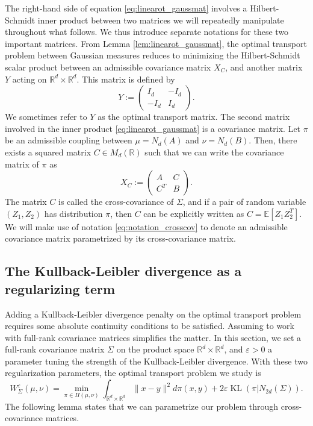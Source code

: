 \documentclass[]{article}
\DeclareMathOperator{\KL}{KL}
\numberwithin{equation}{section}
\theoremstyle{plain}
\begin{document}
The right-hand side of equation \eqref{eq:linearot_gaussmat} involves a Hilbert-Schmidt inner product between two matrices we will repeatedly manipulate throughout what follows. We thus introduce separate notations for these two important matrices. From Lemma \ref{lem:linearot_gaussmat}, the optimal transport problem between Gaussian measures reduces to minimizing the Hilbert-Schmidt scalar product between an admissible covariance matrix $X_C$, and another matrix $Y$ acting on $\mathbb{R}^d \times \mathbb{R}^d$. This matrix is defined by  
	\begin{equation}\label{eq:notation_otmatrix}
		Y := \begin{pmatrix}
			I_d & -I_d \\
			-I_d & I_d
		\end{pmatrix}.
	\end{equation}
	We sometimes refer to $Y$ as the optimal transport matrix. The second matrix involved in the inner product \eqref{eq:linearot_gaussmat} is a covariance matrix.  Let $\pi$ be an admissible coupling between $\mu=N_d(A)$ and $\nu = N_d(B)$. Then, there exists a squared matrix $C \in M_d(\mathbb{R})$ such that we can write the covariance matrix of $\pi$ as
	\begin{equation}\label{eq:notation_crosscov}
		X_C := \begin{pmatrix}
			A & C \\
			C^T & B
		\end{pmatrix}.
	\end{equation}
The matrix $C$ is called the cross-covariance of $\Sigma$, and if a pair of random variable $(Z_1,Z_2)$ has distribution $\pi$, then $C$ can be explicitly written as $C = \mathbb{E}[Z_1 Z_2^T]$. We will make use of notation \eqref{eq:notation_crosscov} to denote an admissible covariance matrix parametrized by its cross-covariance matrix.



\subsection{The Kullback-Leibler divergence as a regularizing term}\label{sec:gaussian_regularization}

Adding a Kullback-Leibler divergence penalty on the optimal transport problem requires some absolute continuity conditions to be satisfied. Assuming to work with full-rank covariance matrices simplifies the matter. 
In this section, we set a full-rank covariance matrix $\Sigma$ on the product space $\mathbb{R}^d \times \mathbb{R}^d$, and $\varepsilon > 0$ a parameter tuning the strength of the Kullback-Leibler divergence. With these two regularization parameters, the optimal transport problem we study is
\begin{equation}\label{eq:eot_gauss_refcpl}
  W_\Sigma^{\varepsilon}(\mu, \nu) =  \min_{\pi \in \Pi(\mu, \nu)} \int_{ \mathbb{R}^d \times  \mathbb{R}^d} \|x-y\|^2 d\pi(x,y) + 2 \varepsilon \KL(\pi|N_{2d}(\Sigma)).
\end{equation} 
The following lemma states that we can parametrize our problem through cross-covariance matrices. 
\end{document}
